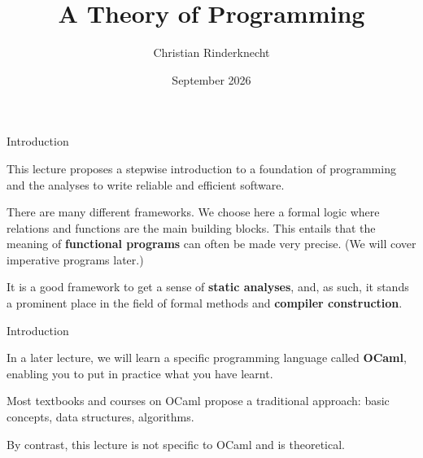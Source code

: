 \documentclass[compress,dvipdfmx]{beamer}
\title{A Theory of Programming}
\author{Christian Rinderknecht}
\institute{Eszterházy Károly Katolikus Egyetem}
\date{September 2026}
\newcommand{\OCaml}{\textsf{OCaml}\xspace}
\begin{document}
\frame{\maketitle}

%
\begin{frame}{Introduction}

  This lecture proposes a stepwise introduction to a foundation of
  programming and the analyses to write reliable and efficient
  software.

  \bigskip

  There are many different frameworks. We choose here a formal logic
  where relations and functions are the main building blocks. This
  entails that the meaning of \textbf{functional programs} can often
  be made very precise. (We will cover imperative programs later.)

  \bigskip

  It is a good framework to get a sense of \textbf{static analyses},
  and, as such, it stands a prominent place in the field of formal
  methods and \textbf{compiler construction}.

\end{frame}

%
\begin{frame}{Introduction}

  In a later lecture, we will learn a specific programming language
  called \textbf{\OCaml}, enabling you to put in practice what you
  have learnt.

  \bigskip

  Most textbooks and courses on \OCaml propose a traditional approach:
  basic concepts, data structures, algorithms.

  \bigskip

  By contrast, this lecture is not specific to \OCaml and is
  theoretical.

\end{frame}
\end{document}
